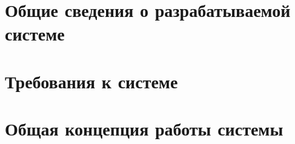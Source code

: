 \newpage
{}



\newpage\section{Общие сведения о разрабатываемой системе}



\newpage\section{Требования к системе}



\newpage\section{Общая концепция работы системы}



\newpage{}